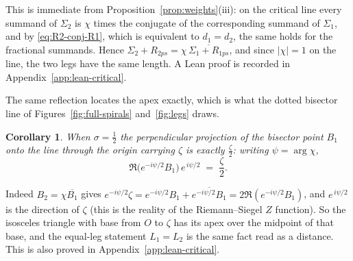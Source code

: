 \documentclass[11pt]{article}
\newtheorem{corollary}[theorem]{Corollary}
\theoremstyle{definition}
\begin{document}
This is immediate from Proposition~\ref{prop:weights}(iii):
on the critical line every summand of $\Sigma_2$ is $\chi$ times the
conjugate of the corresponding summand of $\Sigma_1$, and by
\eqref{eq:R2-conj-R1}, which is equivalent to $d_1=d_2$, the same holds for the
fractional summands. Hence
$\Sigma_2+R_{2ps} = \chi\,\overline{\Sigma_1+R_{1ps}}$, and since $|\chi|=1$
on the line, the two legs have the same length. A Lean proof is recorded in
Appendix~\ref{app:lean-critical}.

The same reflection locates the apex exactly, which is what the dotted bisector
line of Figures~\ref{fig:full-spirals} and~\ref{fig:legs} draws.

\begin{corollary}\label{cor:bisector-proj}
When $\sigma=\tfrac12$ the perpendicular projection of the bisector point $B_1$
onto the line through the origin carrying $\zeta$ is exactly $\tfrac{\zeta}{2}$:
writing $\psi=\arg\chi$,
\begin{equation}\label{eq:bisector-proj}
\Re\!\bigl(e^{-i\psi/2}B_1\bigr)\,e^{\,i\psi/2}\;=\;\frac{\zeta}{2}.
\end{equation}
\end{corollary}

Indeed $B_2=\chi\overline{B_1}$ gives
$e^{-i\psi/2}\zeta=e^{-i\psi/2}B_1+\overline{e^{-i\psi/2}B_1}
=2\Re(e^{-i\psi/2}B_1)$, and $e^{\,i\psi/2}$ is the direction of $\zeta$ (this is
the reality of the Riemann--Siegel $Z$ function). So the isosceles triangle with
base from $O$ to $\zeta$ has its apex over the midpoint of that base, and the
equal-leg statement $L_1=L_2$ is the same fact read as a distance. This is
also proved in Appendix~\ref{app:lean-critical}.
\end{document}

